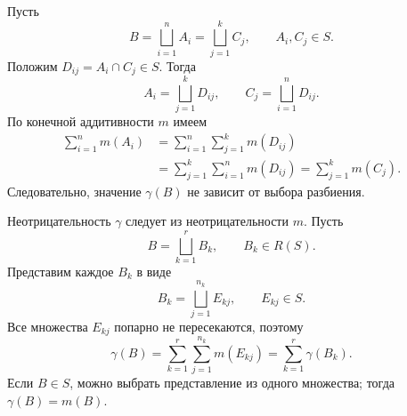 \begin{Proof}
    Пусть
    \[
        B=\bigsqcup_{i=1}^{n}A_i=\bigsqcup_{j=1}^{k}C_j,
        \qquad A_i,C_j\in S.
    \]
    Положим $D_{ij}=A_i\cap C_j\in S$. Тогда
    \[
        A_i=\bigsqcup_{j=1}^{k}D_{ij},\qquad
        C_j=\bigsqcup_{i=1}^{n}D_{ij}.
    \]
    По конечной аддитивности $m$ имеем
    \[
        \begin{aligned}
            \sum_{i=1}^{n}m(A_i)
            &=\sum_{i=1}^{n}\sum_{j=1}^{k}m(D_{ij})\\
            &=\sum_{j=1}^{k}\sum_{i=1}^{n}m(D_{ij})
              =\sum_{j=1}^{k}m(C_j).
        \end{aligned}
    \]
    Следовательно, значение $\gamma(B)$ не зависит от выбора разбиения.
\end{Proof}

\begin{Proof}
    Неотрицательность $\gamma$ следует из неотрицательности $m$.
    Пусть
    \[
        B=\bigsqcup_{k=1}^{r}B_k,\qquad B_k\in R(S).
    \]
    Представим каждое $B_k$ в виде
    \[
        B_k=\bigsqcup_{j=1}^{n_k}E_{kj},\qquad E_{kj}\in S.
    \]
    Все множества $E_{kj}$ попарно не пересекаются, поэтому
    \[
        \gamma(B)=\sum_{k=1}^{r}\sum_{j=1}^{n_k}m(E_{kj})
                 =\sum_{k=1}^{r}\gamma(B_k).
    \]
    Если $B\in S$, можно выбрать представление из одного множества;
    тогда $\gamma(B)=m(B)$.
\end{Proof}
\endgroup
